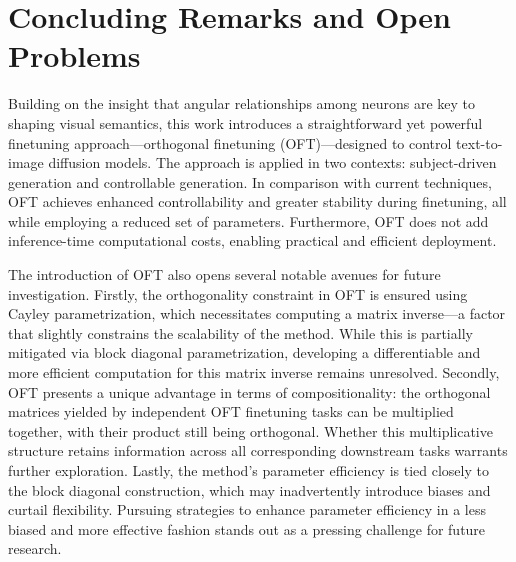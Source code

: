 \section{Concluding Remarks and Open Problems}

Building on the insight that angular relationships among neurons are key to shaping visual semantics, this work introduces a straightforward yet powerful finetuning approach—orthogonal finetuning (OFT)—designed to control text-to-image diffusion models. The approach is applied in two contexts: subject-driven generation and controllable generation. In comparison with current techniques, OFT achieves enhanced controllability and greater stability during finetuning, all while employing a reduced set of parameters. Furthermore, OFT does not add inference-time computational costs, enabling practical and efficient deployment.

The introduction of OFT also opens several notable avenues for future investigation. Firstly, the orthogonality constraint in OFT is ensured using Cayley parametrization, which necessitates computing a matrix inverse—a factor that slightly constrains the scalability of the method. While this is partially mitigated via block diagonal parametrization, developing a differentiable and more efficient computation for this matrix inverse remains unresolved. Secondly, OFT presents a unique advantage in terms of compositionality: the orthogonal matrices yielded by independent OFT finetuning tasks can be multiplied together, with their product still being orthogonal. Whether this multiplicative structure retains information across all corresponding downstream tasks warrants further exploration. Lastly, the method's parameter efficiency is tied closely to the block diagonal construction, which may inadvertently introduce biases and curtail flexibility. Pursuing strategies to enhance parameter efficiency in a less biased and more effective fashion stands out as a pressing challenge for future research.

